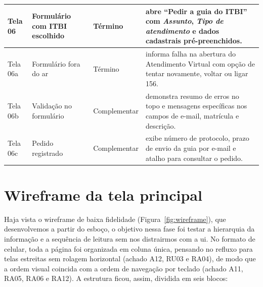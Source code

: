 \documentclass[
  12pt,
  oneside,
  a4paper,
  chapter=TITLE,
  section=TITLE,
  english,
  brazilian
]{abntex2}
\renewcommand{\fonte}[1]{\par\vspace{3pt}{\footnotesize\raggedright\noindent Fonte: #1\par}\vspace{4pt}}%
\newcommand{\autores}{Elaborado pelos autores (2026).}
\begin{document}
\begin{quadro}[!htbp]
\begin{tabularx}{\textwidth}{|P{1.4cm}|P{3.6cm}|P{2.3cm}|Y|}
    Tela 06 & Formulário com ITBI escolhido & Término & abre ``Pedir a guia do ITBI'' com \textit{Assunto}, \textit{Tipo de atendimento} e dados cadastrais pré-preenchidos. \\\hline
    Tela 06a & Formulário fora do ar & Término & informa falha na abertura do Atendimento Virtual com opção de tentar novamente, voltar ou ligar 156. \\\hline
    Tela 06b & Validação no formulário & Complementar & demonstra resumo de erros no topo e mensagens específicas nos campos de e-mail, matrícula e descrição. \\\hline
    Tela 06c & Pedido registrado & Complementar & exibe número de protocolo, prazo de envio da guia por e-mail e atalho para consultar o pedido. \\\hline
  \end{tabularx}
  \fonte{\autores}
\end{quadro}\FloatBarrier

\chapter{Wireframe da tela principal}\label{cap:wireframe}

Haja vista o wireframe de baixa fidelidade (Figura~\ref{fig:wireframe}), que desenvolvemos a partir do esboço, o objetivo nessa fase foi testar a
hierarquia da informação e a sequência de leitura sem nos distrairmos com a ui. No
formato de celular, toda a página foi organizada em coluna única, pensando no
refluxo para telas estreitas sem rolagem horizontal (achado A12, RU03 e RA04),
de modo que a ordem visual coincida com a ordem de navegação por teclado
(achado A11, RA05, RA06 e RA12). A estrutura ficou, assim, dividida em seis blocos:
\end{document}
